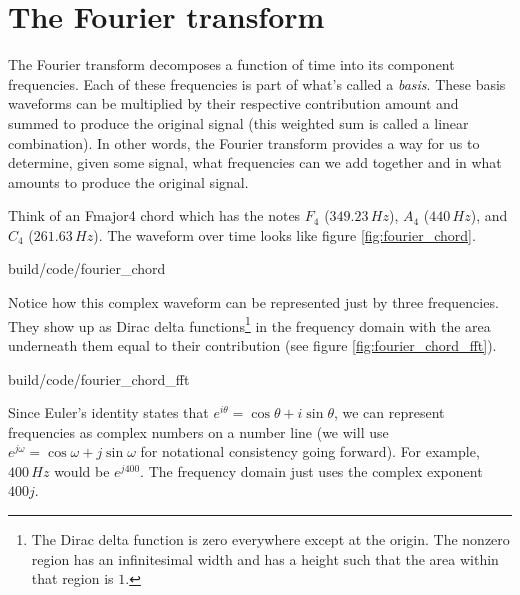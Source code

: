 \section{The Fourier transform}

The Fourier transform decomposes a function of time into its component
frequencies. Each of these frequencies is part of what's called a
\textit{basis}. These basis waveforms can be multiplied by their respective
contribution amount and summed to produce the original signal (this weighted sum
is called a linear combination). In other words, the Fourier transform provides
a way for us to determine, given some signal, what frequencies can we add
together and in what amounts to produce the original signal.

Think of an Fmajor4 chord which has the notes $F_4$ ($349.23\,Hz$), $A_4$
($440\,Hz$), and $C_4$ ($261.63\,Hz$). The waveform over time looks like figure
\ref{fig:fourier_chord}.

\begin{svg}{build/code/fourier_chord}
  \caption{Frequency decomposition of Fmajor4 chord}
  \label{fig:fourier_chord}
\end{svg}

Notice how this complex waveform can be represented just by three frequencies.
They show up as Dirac delta functions\footnote{The Dirac delta function is zero
everywhere except at the origin. The nonzero region has an infinitesimal width
and has a height such that the area within that region is $1$.} in the frequency
domain with the area underneath them equal to their contribution (see figure
\ref{fig:fourier_chord_fft}).

\begin{svg}{build/code/fourier_chord_fft}
  \caption{Fourier transform of Fmajor4 chord}
  \label{fig:fourier_chord_fft}
\end{svg}

Since Euler's identity states that $e^{i\theta} = \cos\theta + i\sin\theta$, we
can represent frequencies as complex numbers on a number line (we will use
$e^{j\omega} = \cos\omega + j\sin\omega$ for notational consistency going
forward). For example, $400\,Hz$ would be $e^{j400}$. The frequency domain just
uses the complex exponent $400j$.
